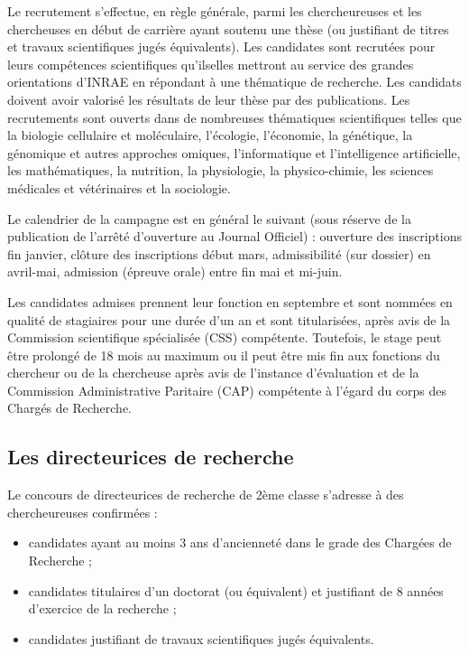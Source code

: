 Le recrutement s’effectue, en r\`egle g\'en\'erale, parmi les chercheur\mp euse\mp s et les chercheuses en d\'ebut de carri\`ere ayant soutenu une th\`ese (ou justifiant de titres et travaux scientifiques jug\'es \'equivalents). Les candidat\mp e\mp s sont recrut\'e\mp e\mp s pour leurs comp\'etences scientifiques qu'ils\mp elles mettront au service des grandes orientations d'INRAE en r\'epondant \`a une th\'ematique de recherche. Les candidats doivent avoir valoris\'e les r\'esultats de leur th\`ese par des publications. Les recrutements sont ouverts dans de nombreuses th\'ematiques scientifiques telles que la biologie cellulaire et mol\'eculaire, l'\'ecologie, l'\'economie, la g\'en\'etique, la g\'enomique et autres approches \og omiques\fg{}, l'informatique et l'intelligence artificielle, les math\'ematiques, la nutrition, la physiologie, la physico-chimie, les sciences m\'edicales et v\'et\'erinaires et la sociologie. 

Le calendrier de la campagne est en g\'en\'eral le suivant (sous r\'eserve de la publication de l'arr\^et\'e d'ouverture au Journal Officiel) : ouverture des inscriptions fin janvier, cl\^oture des inscriptions d\'ebut mars, admissibilit\'e (sur dossier) en avril-mai, admission (\'epreuve orale) entre fin mai et mi-juin. 

Les candidat\mp e\mp s admis\mp e\mp s prennent leur fonction en septembre et sont nomm\'e\mp e\mp s en qualit\'e de stagiaires pour une dur\'ee d'un an et sont titularis\'e\mp es, apr\`es avis de la Commission scientifique sp\'ecialis\'ee (CSS) comp\'etente. Toutefois, le stage peut \^etre prolong\'e de 18 mois au maximum ou il peut \^etre mis fin aux fonctions du chercheur ou de la chercheuse apr\`es avis de l'instance d'\'evaluation et de la Commission Administrative Paritaire (CAP) comp\'etente \`a l'\'egard du corps des Charg\'es de Recherche.


\subsection{ Les directeur\mp ice\mp s de recherche}

Le concours de directeur\mp ice\mp s de recherche de 2\`eme classe s'adresse \`a des chercheur\mp euse\mp s confirm\'e\mp e\mp s :
\begin{itemize}
\item candidat\mp e\mp s ayant au moins 3 ans d'anciennet\'e dans le grade des Charg\'e\mp e\mp s de Recherche ;
\item candidat\mp e\mp s titulaires d'un doctorat (ou \'equivalent) et justifiant de 8 ann\'ees d'exercice de la recherche ;
\item candidat\mp e\mp s justifiant de travaux scientifiques jug\'es \'equivalents.
\end{itemize}


